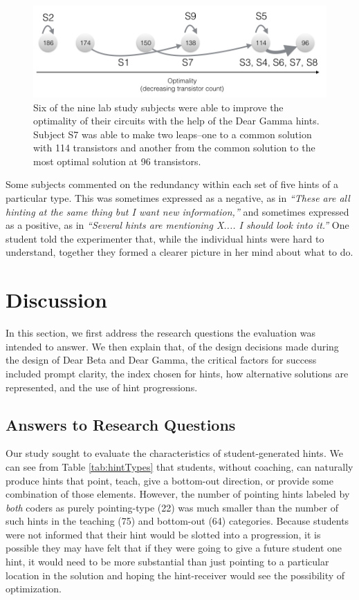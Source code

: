 \documentclass[12pt,twoside]{mitthesis}
\begin{document}
{{{{{{{{{{\begin{figure}
\centering
\includegraphics[width=1.0\columnwidth]{Body/figures/classoverflow/dearGammaResults.png}
\caption{Six of the nine lab study subjects were able to improve the optimality of their circuits with the help of the Dear Gamma hints. Subject S7 was able to make two leaps--one to a common solution with 114 transistors and another from the common solution to the most optimal solution at 96 transistors.}
\label{fig:gammaresults}
\end{figure}

Some subjects commented on the redundancy within each set of five hints of a particular type. This was sometimes expressed as a negative, as in {\it ``These are all hinting at the same thing but I want new information,''} and sometimes expressed as a positive, as in {\it ``Several hints are mentioning X.... I should look into it.''} One student told the experimenter that, while the individual hints were hard to understand, together they formed a clearer picture in her mind about what to do.


\section{Discussion}
In this section, we first address the research questions the evaluation was intended to answer. We then explain that, of the design decisions made during the design of Dear Beta and Dear Gamma, the critical factors for success included prompt clarity, the index chosen for hints, how alternative solutions are represented, and the use of hint progressions.

\subsection{Answers to Research Questions}

Our study sought to evaluate the characteristics of student-generated hints. We can see from Table \ref{tab:hintTypes} that students, without coaching, can naturally produce hints that point, teach, give a bottom-out direction, or provide some combination of those elements. However, the number of pointing hints labeled by {\it both} coders as purely pointing-type (22) was much smaller than the number of such hints in the teaching (75) and bottom-out (64) categories. Because students were not informed that their hint would be slotted into a progression, it is possible they may have felt that if they were going to give a future student one hint, it would need to be more substantial than just pointing to a particular location in the solution and hoping the hint-receiver would see the possibility of optimization.

}}}}}}}}}}
\end{document}

